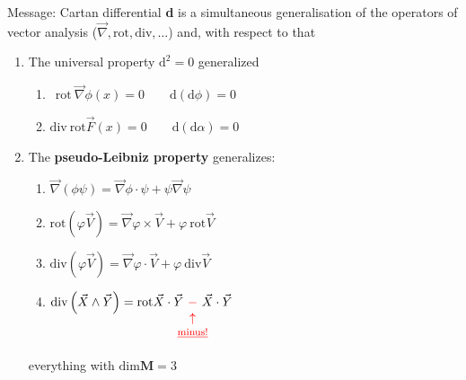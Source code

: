 \documentclass[../main.tex]{subfiles}
\begin{document}
{\selectfont{}\relax} Message: Cartan differential \textbf{d} is a simultaneous generalisation of the operators of vector analysis ($\vec{\nabla}, \textrm{rot}, \textrm{div}, \dots$) and, with respect to that
\begin{enumerate}
    \item The universal property $\textrm{d}^2=0$ generalized
    \begin{enumerate}
        \item \(\ \ \textrm{rot}\ \vec{\nabla}\phi(x)=0 \qquad \textrm{d}\left(\textrm{d}\phi\right)=0\)
        \item \(\textrm{div}\ \textrm{rot}\vec{F}(x)=0 \qquad \textrm{d}\left(\textrm{d}\alpha\right)=0\)
    \end{enumerate}
    \item The \textbf{pseudo-Leibniz property} generalizes:
    \begin{enumerate}
        \item $\vec{\nabla}\left(\phi\psi\right)=\vec{\nabla}\phi\cdot\psi+\psi\vec{\nabla}\psi$
        \item \(\textrm{rot}\left(\varphi\vec{V}\right)=\vec{\nabla}\varphi\times\vec{V}+\varphi \ \textrm{rot}\vec{V}\)
        \item \(\textrm{div}\left(\varphi\vec{V}\right)=\vec{\nabla}\varphi\cdot\vec{V}+\varphi \ \textrm{div}\vec{V}\)
        \item \(\textrm{div}\left(\vec{X}\wedge\vec{Y}\right)=\textrm{rot}\vec{X}\cdot\vec{Y}\ {\color{red}\underset{\mathclap{\tikz \node {\color{red}$\uparrow$} node [below=1ex] {\footnotesize \color{red} \underline{minus!} };}}{-}}\ \vec{X}\cdot\vec{Y}\)
    \end{enumerate}
    everything with $\textrm{dim}\mathbf{M}=3$
\end{enumerate}
\end{document}
